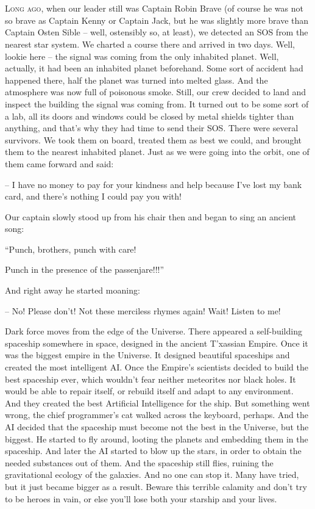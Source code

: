 \documentclass[ebook,oneside,final,openright]{memoir}
\begin{document}
\chapter{}
\par
\lettrine{L}{ong ago,} when our leader still was Captain Robin Brave (of course he was not so brave as Captain Kenny or Captain Jack, but he was slightly more brave than Captain Osten Sible – well, ostensibly so, at least), we detected an SOS from the nearest star system. We charted a course there and arrived in two days. Well, lookie here – the signal was coming from the only inhabited planet. Well, actually, it had been an inhabited planet beforehand. Some sort of accident had happened there, half the planet was turned into melted glass. And the atmosphere was now full of poisonous smoke. Still, our crew decided to land and inspect the building the signal was coming from. It turned out to be some sort of a lab, all its doors and windows could be closed by metal shields tighter than anything, and that’s why they had time to send their SOS. There were several survivors. We took them on board, treated them as best we could, and brought them to the nearest inhabited planet. Just as we were going into the orbit, one of them came forward and said: \par
\par
– I have no money to pay for your kindness and help because I’ve lost my bank card, and there’s nothing I could pay you with!\par
Our captain slowly stood up from his chair then and began to sing an ancient song: \par
“Punch, brothers, punch with care! \par
 Punch in the presence of the passenjare!!!” \par
And right away he started moaning: \par
 – No! Please don’t! Not these merciless rhymes again! Wait! Listen to me!\par
\par
Dark force moves from the edge of the Universe. There appeared a self-building spaceship somewhere in space, designed in the ancient T’xassian Empire. Once it was the biggest empire in the Universe. It designed beautiful spaceships and created the most intelligent AI. Once the Empire’s scientists decided to build the best spaceship ever, which wouldn’t fear neither meteorites nor black holes. It would be able to repair itself, or rebuild itself and adapt to any environment. And they created the best Artificial Intelligence for the ship. But something went wrong, the chief programmer’s cat walked across the keyboard, perhaps. And the AI decided that the spaceship must become not the best in the Universe, but the biggest. He started to fly around, looting the planets and embedding them in the spaceship. And later the AI started to blow up the stars, in order to obtain the needed substances out of them. And the spaceship still flies, ruining the gravitational ecology of the galaxies. And no one can stop it. Many have tried, but it just became bigger as a result. Beware this terrible calamity and don’t try to be heroes in vain, or else you’ll lose both your starship and your lives.\par
\end{document}

